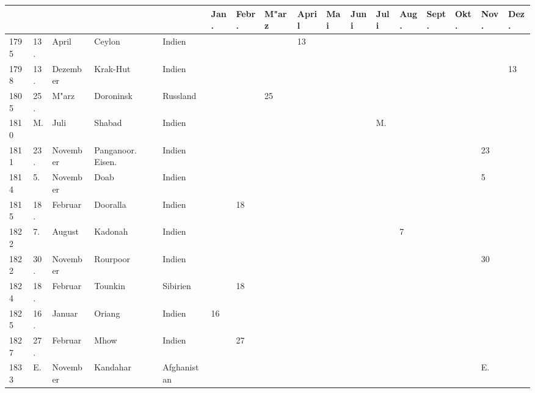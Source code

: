 \documentclass[a4paper, 8pt, oneside, polutonikogreek, german]{article}
\begin{document}
\section{}
\vspace*{\fill}
\clearpage
\begin{landscape}
\begin{table}[H]
    \centering
    \frakfamily
    \footnotesize
    \begin{longtable}{|l|l|l|l|l|l|l|l|l|l|l|l|l|l|l|l|l|}
    \hline
         & & & & & Jan. & Febr. & M"arz & April & Mai & Juni & Juli & Aug. & Sept. & Okt. & Nov. & Dez. \\ \hline
        1795 & 13. & April & Ceylon & Indien & ~ & ~ & ~ & 13 & ~ & ~ & ~ & ~ & ~ & ~ & ~ & ~ \\ \hline
        1798 & 13. & Dezember & Krak-Hut & Indien & ~ & ~ & ~ & ~ & ~ & ~ & ~ & ~ & ~ & ~ & ~ & 13 \\ \hline
        1805 & 25. & M"arz & Doroninsk & Russland & ~ & ~ & 25 & ~ & ~ & ~ & ~ & ~ & ~ & ~ & ~ & ~ \\ \hline
        1810 & M. & Juli & Shabad & Indien & ~ & ~ & ~ & ~ & ~ & ~ & M. & ~ & ~ & ~ & ~ & ~ \\ \hline
        1811 & 23. & November & Panganoor. Eisen. & Indien & ~ & ~ & ~ & ~ & ~ & ~ & ~ & ~ & ~ & ~ & 23 & ~ \\ \hline
        1814 & 5. & November & Doab & Indien & ~ & ~ & ~ & ~ & ~ & ~ & ~ & ~ & ~ & ~ & 5 & ~ \\ \hline
        1815 & 18. & Februar & Dooralla & Indien & ~ & 18 & ~ & ~ & ~ & ~ & ~ & ~ & ~ & ~ & ~ & ~ \\ \hline
        1822 & 7. & August & Kadonah & Indien & ~ & ~ & ~ & ~ & ~ & ~ & ~ & 7 & ~ & ~ & ~ & ~ \\ \hline
        1822 & 30. & November & Rourpoor & Indien & ~ & ~ & ~ & ~ & ~ & ~ & ~ & ~ & ~ & ~ & 30 & ~ \\ \hline
        1824 & 18. & Februar & Tounkin & Sibirien & ~ & 18 & ~ & ~ & ~ & ~ & ~ & ~ & ~ & ~ & ~ & ~ \\ \hline
        1825 & 16. & Januar & Oriang & Indien & 16 & ~ & ~ & ~ & ~ & ~ & ~ & ~ & ~ & ~ & ~ & ~ \\ \hline
        1827 & 27. & Februar & Mhow & Indien & ~ & 27 & ~ & ~ & ~ & ~ & ~ & ~ & ~ & ~ & ~ & ~ \\ \hline
        1833 & E. & November & Kandahar & Afghanistan & ~ & ~ & ~ & ~ & ~ & ~ & ~ & ~ & ~ & ~ & E. & ~ \\ \hline

\end{longtable}
\end{table}
\end{landscape}
\end{document}
